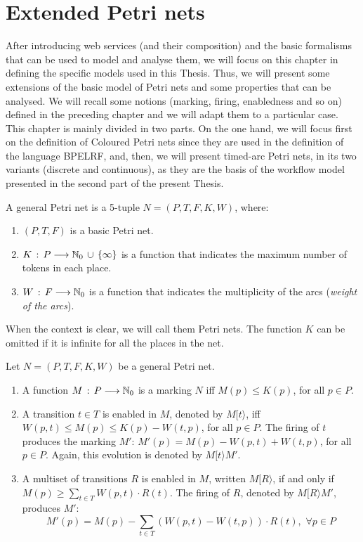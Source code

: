 \chapter{Extended Petri nets}\label{chapter:c3}
After introducing web services (and their composition) and the basic formalisms
that can be used to model and analyse them, we will focus on this chapter in defining the specific models used in this Thesis. Thus, we
will present some extensions of the basic model of Petri nets and some properties
that can be analysed. We will recall some notions (marking, firing, enabledness and so on) defined in the preceding chapter
and we will adapt them to a particular case. This chapter is mainly divided in two parts. On the one hand,
we will focus first on the definition of Coloured Petri nets since they are used in the definition of the language BPELRF, and, then,
we will present timed-arc Petri nets, in its two variants (discrete and continuous), as they are the basis of the workflow model presented in the
second part of the present Thesis.

\begin{definition} 
A general Petri net is a 5-tuple $N=(P,T,F,K,W)$, where:
\begin{enumerate}
\item $(P,T,F)$ is a basic Petri net.
\item $K\,:\,P \longrightarrow \mathbb{N}_{0} \,\cup\, \{\infty\}$ is a function that
indicates the maximum number of tokens in each place.
\item $W\,:\,F \longrightarrow \mathbb{N}_{0}$ is a function that indicates
the multiplicity of the arcs ({\it weight of the arcs}).
\end{enumerate}
When the context is clear, we will call them Petri nets. The function $K$
can be omitted if it is infinite for all the places in the net.
\end{definition}

\begin{definition} 
Let $N=(P,T,F,K,W)$ be a general Petri net.
\begin{enumerate}
\item A function $M\,:\, P \longrightarrow \mathbb{N}_{0}$ is a marking
$N$ iff $M(p) \leq K(p)$, for all
$p \in P$.
\item A transition $t \in T$ is enabled in $M$, denoted by $M[ t \rangle$,
iff $W(p,t) \leq M(p) \leq K(p) - W(t,p)$, for all $p \in P$.
The firing of $t$ produces the marking $M'$:
$M'(p) = M(p) - W(p,t) + W(t,p)$, for all $p \in P$.
Again, this evolution is denoted by $M[ t \rangle M'$.
\item A multiset of transitions $R$ is enabled in $M$, written $M [ R \rangle$, if and only if
$M(p) \geq \sum_{t \in T} W(p,t) \cdot R(t)$. The firing of $R$,  denoted by $M [ R \rangle M'$,
produces $M'$:
\[ M'(p) = M(p) - \sum_{t \in T} (W(p,t) - W(t,p)) \cdot R(t), \,\,
\forall p \in P\]
\end{enumerate}
\end{definition}

